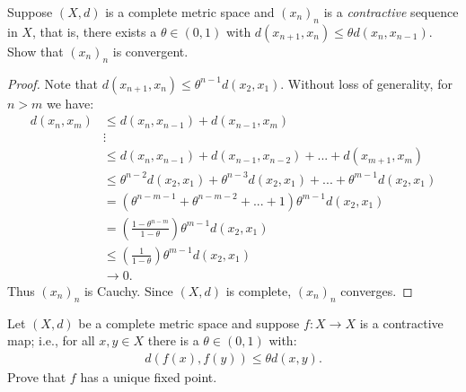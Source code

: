 \documentclass[11pt,twoside,openany]{memoir}
\begin{document}
    \newpage
    \begin{exercise}
        Suppose $(X,d)$ is a complete metric space and $(x_n)_n$ is a \textit{contractive} sequence in $X$, that is, there exists a $\theta \in (0,1)$ with $d(x_{n+1},x_n) \leq \theta d(x_n,x_{n-1})$. Show that $(x_n)_n$ is convergent.
    \end{exercise}
        \begin{proof}
            Note that $d(x_{n+1},x_n) \leq \theta^{n-1}d(x_2,x_1)$. Without loss of generality, for $n>m$ we have:
                \begin{equation*}
                \begin{split}
                    d(x_n,x_m)
                    & \leq d(x_{n},x_{n-1}) + d(x_{n-1},x_m) \\
                    & \vdots \\
                    & \leq d(x_n,x_{n-1}) + d(x_{n-1},x_{n-2}) + ... + d(x_{m+1},x_m) \\
                    & \leq \theta^{n-2}d(x_2,x_1) + \theta^{n-3}d(x_2,x_1) + ... + \theta^{m-1}d(x_2,x_1) \\
                    & = (\theta^{n-m-1} + \theta^{n-m-2} + ... + 1)\theta^{m-1}d(x_2,x_1) \\
                    & = \left( \frac{1 - \theta^{n-m}}{1 - \theta} \right)\theta^{m-1}d(x_2,x_1) \\
                    & \leq \left( \frac{1}{1-\theta} \right)\theta^{m-1}d(x_2,x_1) \\
                    & \rightarrow 0.
                \end{split}
                \end{equation*}
            Thus $(x_n)_n$ is Cauchy. Since $(X,d)$ is complete, $(x_n)_n$ converges.
        \end{proof}
    \begin{exercise}
        Let $(X,d)$ be a complete metric space and suppose $f:X \rightarrow X$ is a contractive map; i.e., for all $x,y \in X$ there is a $\theta \in (0,1)$ with:
            \begin{equation*}
            \begin{split}
                d(f(x),f(y)) \leq \theta d(x,y).
            \end{split}
            \end{equation*}
        Prove that $f$ has a unique fixed point.
    \end{exercise}
\end{document}

